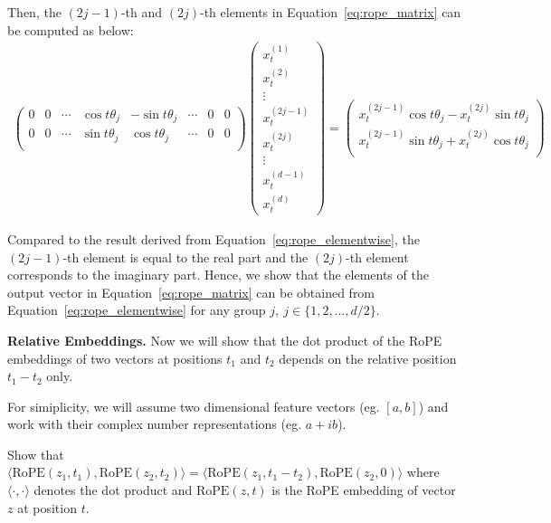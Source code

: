 \begin{parts}
\begin{subparts}
{    Then, the $(2j-1)$-th and $(2j)$-th elements in Equation~\ref{eq:rope_matrix} can be computed as below:
    \begin{align*}
        \begin{pmatrix}
            0 & 0 & \cdots & \cos t\theta_j & -\sin t\theta_j & \cdots & 0 & 0\\
            0 & 0 & \cdots & \sin t\theta_j & \cos t\theta_j & \cdots & 0 & 0\\
        \end{pmatrix}
        \begin{pmatrix}
            x^{(1)}_t \\ x^{(2)}_t \\ \vdots \\ x^{(2j-1)}_t \\ x^{(2j)}_t \\ \vdots \\ x^{(d-1)}_t \\ x^{(d)}_t 
        \end{pmatrix}
        = 
        \begin{pmatrix}
            x^{(2j-1)}_t \cos t\theta_j - x^{(2j)}_t \sin t\theta_j \\
            x^{(2j-1)}_t \sin t\theta_j + x^{(2j)}_t \cos t\theta_j \\
        \end{pmatrix}
    \end{align*}

    Compared to the result derived from Equation~\ref{eq:rope_elementwise}, the $(2j-1)$-th element is equal to the real part and the $(2j)$-th element corresponds to the imaginary part. Hence, we show that the elements of the output vector in Equation~\ref{eq:rope_matrix} can be obtained from Equation~\ref{eq:rope_elementwise} for any group $j,\ j \in \{1, 2, \ldots, d/2\}$.
}

\subpart[1] \textbf{Relative Embeddings.} Now we will show that the dot product of the RoPE embeddings of two vectors at positions $t_1$ and $t_2$ depends on the relative position $t_1 - t_2$ only. 

For simiplicity, we will assume two dimensional feature vectors (eg. $[a, b]$) and work with their complex number representations (eg. $a + ib$).

Show that $\langle \text{RoPE}(z_1, t_1), \text{RoPE}(z_2, t_2) \rangle = \langle \text{RoPE}(z_1, t_1 - t_2), \text{RoPE}(z_2, 0) \rangle$ where $\langle \cdot, \cdot \rangle$ denotes the dot product and $\text{RoPE}(z, t)$ is the RoPE embedding of vector $z$ at position $t$.


\end{subparts}
\end{parts}

